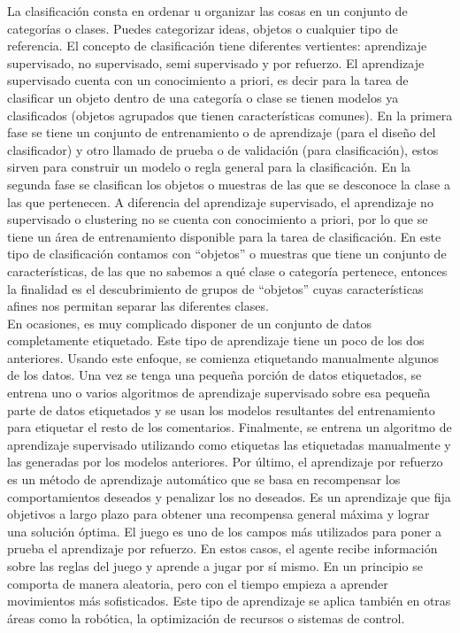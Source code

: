 \documentclass[conference]{IEEEtran}
\begin{document}
La clasificación consta en ordenar u organizar las cosas en un conjunto de categorías o clases. Puedes categorizar ideas, objetos o cualquier tipo de referencia. El concepto de clasificación tiene diferentes vertientes: aprendizaje supervisado, no supervisado, semi supervisado y por refuerzo. El aprendizaje supervisado cuenta con un conocimiento a priori, es decir para la tarea de clasificar un objeto dentro de una categoría o clase se tienen modelos ya clasificados (objetos agrupados que tienen características comunes). En la primera fase se tiene un conjunto de entrenamiento o de aprendizaje (para el diseño del clasificador) y otro llamado de prueba o de validación (para clasificación), estos sirven para construir un modelo o regla general para la clasificación. En la segunda fase se clasifican los objetos o muestras de las que se desconoce la clase a las que pertenecen. 
A diferencia del aprendizaje supervisado, el aprendizaje no supervisado o clustering no se cuenta con conocimiento a priori, por lo que se tiene un área de entrenamiento disponible para la tarea de clasificación. En este tipo de clasificación contamos con “objetos” o muestras que tiene un conjunto de características, de las que no sabemos a qué clase o categoría pertenece, entonces la finalidad es el descubrimiento de grupos de “objetos” cuyas características afines nos permitan separar las diferentes clases. \\

En ocasiones, es muy complicado disponer de un conjunto de datos completamente etiquetado. Este tipo de aprendizaje tiene un poco de los dos anteriores. Usando este enfoque, se comienza etiquetando manualmente algunos de los datos. Una vez se tenga una pequeña porción de datos etiquetados, se entrena uno o varios algoritmos de aprendizaje supervisado sobre esa pequeña parte de datos etiquetados y se usan los modelos resultantes del entrenamiento para etiquetar el resto de los comentarios. Finalmente, se entrena un algoritmo de aprendizaje supervisado utilizando como etiquetas las etiquetadas manualmente y las generadas por los modelos anteriores. 
Por último, el aprendizaje por refuerzo es un método de aprendizaje automático que se basa en recompensar los comportamientos deseados y penalizar los no deseados. Es un aprendizaje que fija objetivos a largo plazo para obtener una recompensa general máxima y lograr una solución óptima. El juego es uno de los campos más utilizados para poner a prueba el aprendizaje por refuerzo. En estos casos, el agente recibe información sobre las reglas del juego y aprende a jugar por sí mismo. En un principio se comporta de manera aleatoria, pero con el tiempo empieza a aprender movimientos más sofisticados.  Este tipo de aprendizaje se aplica también en otras áreas como la robótica, la optimización de recursos o sistemas de control.\\
\end{document}
